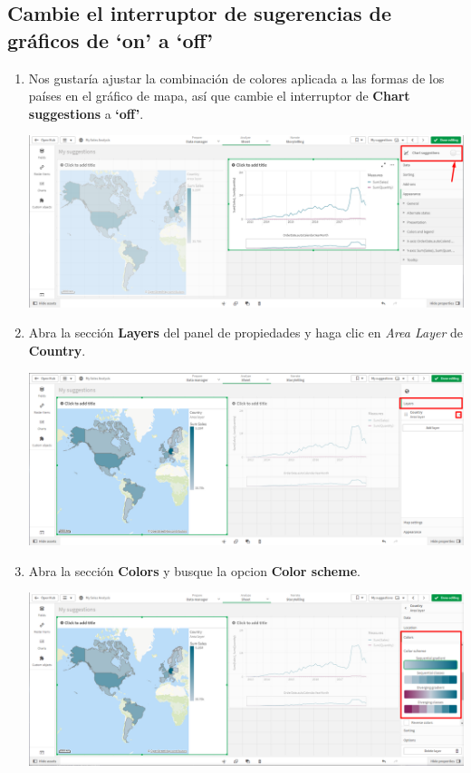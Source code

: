 \documentclass[12pt,letterpaper]{article}
\newcommand\tab[1][1cm]{\hspace*{#1}}
\begin{document}
    \subsection{Cambie el interruptor de sugerencias de gráficos de ‘on’ a ‘off’}
    \begin{enumerate}[\tab 1.]
        \item Nos gustaría ajustar la combinación de colores aplicada a las formas de los países en el gráfico de mapa, así que cambie el interruptor de \textbf{Chart suggestions} a \textbf{‘off’}.
        \begin{center}
            \includegraphics[width=13cm]{./img/img24.png}
        \end{center}
        \item Abra la sección \textbf{Layers} del panel de propiedades y haga clic en \textit{Area Layer} de \textbf{Country}.
        \begin{center}
            \includegraphics[width=13cm]{./img/img25.png}
        \end{center}
        \item Abra la sección \textbf{Colors} y busque la opcion \textbf{Color scheme}.
        \begin{center}
            \includegraphics[width=13cm]{./img/img26.png}

\end{center}
\end{enumerate}
\end{document}
